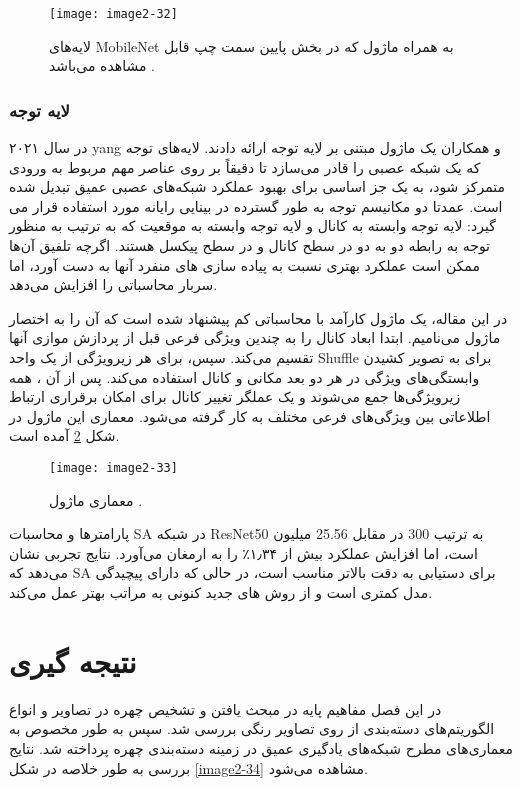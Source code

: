 \begin{figure}[h]
\centering
  \texttt{[image: image2-32]}
  \caption{
لایه‌های MobileNet به همراه ماژول‌  که در بخش پایین سمت چپ قابل مشاهده می‌باشد 
   \cite{yang2021sanet}.}
  \label{image2-32}
\end{figure}

\subsubsection{لایه توجه}
در سال ۲۰۲۱ yang و همکاران \cite{yang2021sanet} یک ماژول مبتنی بر لایه توجه ارائه دادند. لایه‌های توجه که یک شبکه عصبی را قادر می‌سازد تا دقیقاً بر روی عناصر مهم مربوط به ورودی متمرکز شود، به یک جز اساسی برای بهبود عملکرد شبکه‌های عصبی عمیق تبدیل شده است. عمدتا دو مکانیسم توجه به طور گسترده در بینایی رایانه مورد استفاده قرار می گیرد: لایه توجه وابسته به كانال  و لایه توجه وابسته به موقعیت  که به ترتیب به منظور توجه به رابطه دو به دو در سطح کانال و در سطح پیکسل هستند. اگرچه تلفیق آن‌ها ممکن است عملکرد بهتری نسبت به پیاده سازی های منفرد آنها به دست آورد‌، اما سربار محاسباتی را افزایش می‌دهد.

\noindent
در این مقاله، یک ماژول  کارآمد با محاسباتی کم پیشنهاد شده است که آن را به اختصار ماژول  می‌نامیم. ابتدا ابعاد کانال را به چندین ویژگی فرعی قبل از پردازش موازی آنها تقسیم می‌کند. سپس، برای هر زیر‌ویژگی از یک واحد Shuffle برای به تصویر کشیدن وابستگی‌های ویژگی در هر دو بعد مکانی و کانال استفاده می‌کند. پس از آن ، همه زیر‌ویژگی‌ها جمع می‌شوند و یک عملگر تغییر کانال برای امکان برقراری ارتباط اطلاعاتی بین ویژگی‌های فرعی مختلف به کار گرفته می‌شود. معماری این ماژول در شکل \ref{image2-33} آمده است.

\begin{figure}[h]
\centering
  \texttt{[image: image2-33]}
  \caption{
  معماری ماژول 
   \cite{yang2021sanet}.}
  \label{image2-33}
\end{figure}

\noindent
پارامترها و محاسبات SA در شبکه ResNet50 به ترتیب 300 در مقابل 25.56 میلیون است، اما افزایش عملکرد بیش از ۱٫۳۴٪ را به ارمغان می‌آورد. نتایج تجربی نشان می‌دهد که SA برای دستیابی به دقت بالاتر مناسب است، در حالی که دارای پیچیدگی مدل کمتری است و از روش های جدید  کنونی به مراتب بهتر عمل می‌کند.

\section{نتیجه گیری}
در این فصل مفاهیم‌ پایه در مبحث یافتن و تشخیص چهره در تصاویر و انواع الگوریتم‌های دسته‌‌بندی از روی تصاویر رنگی بررسی شد. سپس به طور مخصوص به معماری‌های مطرح شبکه‌های یادگیری عمیق در زمینه دسته‌بندی چهره پرداخته شد. نتایج بررسی به طور خلاصه در شکل \ref{image2-34} مشاهده می‌شود. 

